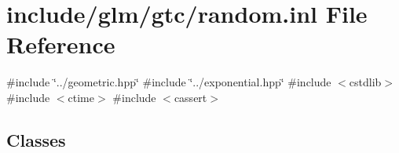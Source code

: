 \hypertarget{random_8inl}{}\section{include/glm/gtc/random.inl File Reference}
\label{random_8inl}
{\ttfamily \#include \char`\"{}../geometric.\+hpp\char`\"{}}\newline
{\ttfamily \#include \char`\"{}../exponential.\+hpp\char`\"{}}\newline
{\ttfamily \#include $<$cstdlib$>$}\newline
{\ttfamily \#include $<$ctime$>$}\newline
{\ttfamily \#include $<$cassert$>$}\newline
\subsection*{Classes}
